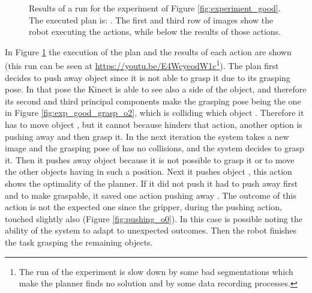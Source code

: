 \begin{figure}
\caption{Results of a run for the experiment of Figure \ref{fig:experiment_good}. The executed plan is:  
. The first and third row of images show the robot executing the actions, while below the results of those actions.}\label{fig:execution_experiment}
\end{figure}

In Figure \ref{fig:execution_experiment} the execution of the plan and the results of each action are shown (this run can be seen at \href{https://youtu.be/E4WcyeodW1c}{\url{https://youtu.be/E4WcyeodW1c}}\footnote{The run of the experiment is slow down by some bad segmentations which make the planner finds no solution and by some data recording processes.}). The plan first decides to push away object  since it is not able to grasp it due to its grasping pose. In that pose the Kinect is able to see also a side of the object, and therefore its second and third principal components make the grasping pose being the one in Figure \ref{fig:exp_good_grasp_o2}, which is colliding which object . Therefore it has to move object , but it cannot because  hinders that action, another option is pushing away  and then grasp it. In the next iteration the system takes a new image and the grasping pose of  has no collisions, and the system decides to grasp it. Then it pushes away object  because it is not possible to grasp it or to move the other objects having  in such a position. Next it pushes object , this action shows the optimality of the planner. If it did not push  it had to push away first  and  to make  graspable, it saved one action pushing away . The outcome of this action is not the expected one since the gripper, during the pushing action, touched slightly also  (Figure \ref{fig:pushing_o0}). In this case is possible noting the ability of the system to adapt to unexpected outcomes. Then the robot finishes the task grasping the remaining objects.



